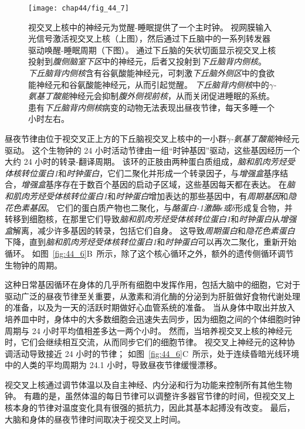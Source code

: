 \begin{figure}[htbp]
	\centering
	\texttt{[image: chap44/fig\_44\_7]}
	\caption{视交叉上核中的神经元为觉醒-睡眠提供了一个主时钟。
		视网膜输入光信号激活视交叉上核（上图），然后通过下丘脑中的一系列转发器驱动唤醒-睡眠周期（下图）。
		通过下丘脑的矢状切面显示视交叉上核投射到\textit{腹侧脑室下区}中的神经元，后者又投射到\textit{下丘脑背内侧核}。
		\textit{下丘脑背内侧核}含有谷氨酸能神经元，可刺激\textit{下丘脑外侧区}中的食欲能神经元和谷氨酸能神经元，从而引起觉醒。
		\textit{下丘脑背内侧核}中的\textit{$\gamma$-氨基丁酸能}神经元会抑制\textit{腹外侧视前核}，从而关闭促进睡眠的系统。
		患有\textit{下丘脑背内侧核}病变的动物无法表现出昼夜节律，每天多睡一个小时左右。}
	\label{fig:44_7}
\end{figure}


昼夜节律由位于视交叉正上方的下丘脑视交叉上核中的一小群\textit{$\gamma$-氨基丁酸能}神经元驱动。
这个生物钟的 24 小时活动节律由一组“时钟基因”驱动，这些基因经历一个大约 24 小时的转录-翻译周期。
该环的正肢由两种蛋白质组成，\textit{脑和肌肉芳烃受体核转位蛋白1}和\textit{时钟蛋白}，它们二聚化并形成一个转录因子，与\textit{增强盒}基序结合，\textit{增强盒}基序存在于数百个基因的启动子区域，这些基因每天都在表达。
在\textit{脑和肌肉芳烃受体核转位蛋白1}和\textit{时钟蛋白}增加表达的那些基因中，有\textit{周期基因}和\textit{隐花色素基因}。
它们的蛋白质产物也二聚化，与\textit{酪蛋白-1激酶$\epsilon$或$\delta$}形成复合物，并转移到细胞核，在那里它们导致\textit{脑和肌肉芳烃受体核转位蛋白1}和\textit{时钟蛋白}从\textit{增强盒}解离，减少许多基因的转录，包括它们自身。
这导致\textit{周期蛋白}和\textit{隐花色素蛋白}下降，直到\textit{脑和肌肉芳烃受体核转位蛋白1}和\textit{时钟蛋白}可以再次二聚化，重新开始循环。
如图~\ref{fig:44_6}B~所示，除了这个核心循环之外，额外的遗传侧循环调节生物钟的周期。


这种日常基因循环在身体的几乎所有细胞中发挥作用，包括大脑中的细胞，它对于驱动广泛的昼夜节律至关重要，从激素和消化酶的分泌到为肝脏做好食物代谢处理的准备，以及为一天的活跃时期做好心血管系统的准备。
当从身体中取出并放入培养皿中时，身体中的大多数细胞会迅速失去同步，因为细胞之间的个体细胞时钟周期与 24 小时平均值相差多达一两个小时。
然而，当培养视交叉上核的神经元时，它们会继续相互交流，从而同步它们的细胞节律。
视交叉上神经元的这种协调活动导致接近 24 小时的节律；
如图~\ref{fig:44_6}C~所示，处于连续昏暗光线环境中的人类的平均周期为 24.1 小时，导致昼夜节律缓慢漂移。


视交叉上核通过调节体温以及自主神经、内分泌和行为功能来控制所有其他生物钟。
有趣的是，虽然体温的每日节律可以调整许多器官节律的时间，但视交叉上核本身的节律对温度变化具有很强的抵抗力，因此其基本起搏没有改变。
最后，大脑和身体的昼夜节律时间取决于视交叉上时间。


